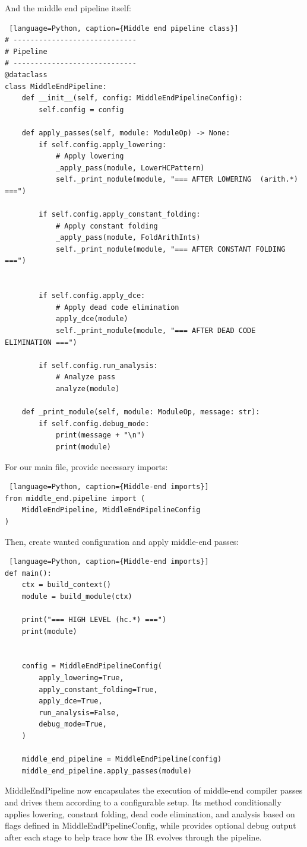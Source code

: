 \documentclass[../main.tex]{subfiles}
\begin{document}
And the middle end pipeline itself:
\begin{lstlisting} [language=Python, caption={Middle end pipeline class}]
# -----------------------------
# Pipeline
# -----------------------------
@dataclass
class MiddleEndPipeline:
    def __init__(self, config: MiddleEndPipelineConfig):
        self.config = config

    def apply_passes(self, module: ModuleOp) -> None:
        if self.config.apply_lowering:
            # Apply lowering
            _apply_pass(module, LowerHCPattern)
            self._print_module(module, "=== AFTER LOWERING  (arith.*) ===")

        if self.config.apply_constant_folding:
            # Apply constant folding
            _apply_pass(module, FoldArithInts)
            self._print_module(module, "=== AFTER CONSTANT FOLDING ===")


        if self.config.apply_dce:
            # Apply dead code elimination
            apply_dce(module)
            self._print_module(module, "=== AFTER DEAD CODE ELIMINATION ===")

        if self.config.run_analysis:
            # Analyze pass
            analyze(module)

    def _print_module(self, module: ModuleOp, message: str):
        if self.config.debug_mode:
            print(message + "\n")
            print(module)
\end{lstlisting}

For our main file, provide necessary imports:
\begin{lstlisting} [language=Python, caption={Middle-end imports}]
from middle_end.pipeline import (
    MiddleEndPipeline, MiddleEndPipelineConfig
)
\end{lstlisting}
Then, create wanted configuration and apply middle-end passes:
\begin{lstlisting} [language=Python, caption={Middle-end imports}]
def main():
    ctx = build_context()
    module = build_module(ctx)

    print("=== HIGH LEVEL (hc.*) ===")
    print(module)


    config = MiddleEndPipelineConfig(
        apply_lowering=True,
        apply_constant_folding=True,
        apply_dce=True,
        run_analysis=False,
        debug_mode=True,
    )

    middle_end_pipeline = MiddleEndPipeline(config)
    middle_end_pipeline.apply_passes(module)
\end{lstlisting}

MiddleEndPipeline now encapsulates the execution of middle-end compiler passes and drives them according to a configurable setup.
Its  method conditionally applies lowering, constant folding, dead code elimination,
and analysis based on flags defined in MiddleEndPipelineConfig, while  provides optional
debug output after each stage to help trace how the IR evolves through the pipeline.
\end{document}
